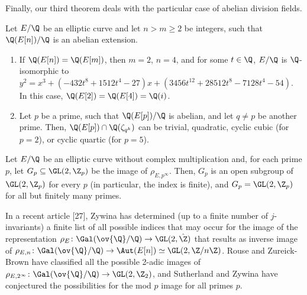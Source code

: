 Finally, our third theorem deals with the particular case of abelian division fields.


\begin{thm} %
Let $E/\Q$ be an elliptic curve and let $n > m \geq 2$ be integers, such that $\Q(E[n])/\Q$ is an abelian extension.
	\begin{enumerate}[(1)]
	\item If $\Q(E[n])= \Q(E[m])$, then $m= 2$, $n= 4$, and for some $t \in \Q$, $E/\Q$ is $\Q$-isomorphic to $y^2= x^3 + (-432t^8 + 1512t^4 - 27)x + (3456t^{12} + 28512t^8 - 7128t^4 - 54)$. In this case, $\Q(E[2])= \Q(E[4])= \Q(i)$.
	\item Let $p$ be a prime, such that $\Q(E[p])/\Q$ is abelian, and let $q \neq p$ be another prime. Then, $\Q(E[p]) \cap \Q(\zeta_{q^k})$ can be trivial, quadratic, cyclic cubic (for $p= 2$), or cyclic quartic (for $p= 5$). 
	\end{enumerate}
\end{thm}




\begin{thm} %
Let $E/\Q$ be an elliptic curve without complex multiplication and, for each prime $p$, let $G_p \subseteq \GL(2,\Z_p)$ be the image of $\rho_{E,p^\infty}$. Then, $G_p$ is an open subgroup of $\GL(2,\Z_p)$ for every $p$ (in particular, the index is finite), and $G_p= \GL(2,\Z_p)$ for all but finitely many primes. 
\end{thm}


In a recent article [27], Zywina has determined (up to a finite number of $j$-invariants) a finite list of all possible indices that may occur for the image of the representation $\rho_E \colon \Gal(\ov{\Q}/\Q) \to \GL(2,\hat{\Z})$ that results as inverse image of $\rho_{E,n} \colon \Gal(\ov{\Q}/\Q) \to \Aut(E[n]) \simeq \GL(2,\Z/n\Z)$. Rouse and Zureick-Brown have classified all the possible 2-adic images of $\rho_{E,2^\infty} \colon \Gal(\ov{\Q}/\Q) \to \GL(2,\Z_2)$, and Sutherland and Zywina have conjectured the possibilities for the mod $p$ image for all primes $p$.


